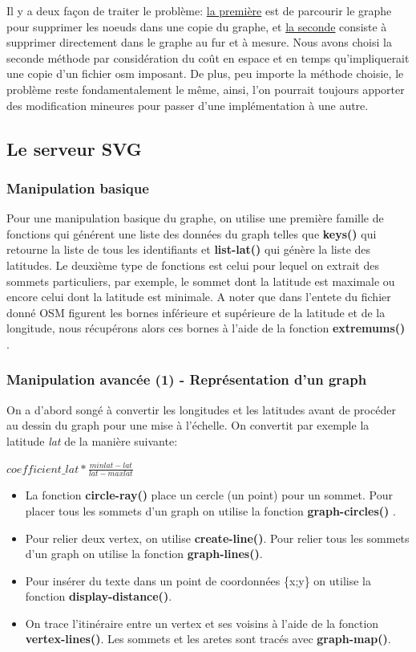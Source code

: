 \documentclass[french]{article}
\begin{document}
Il y a deux façon de traiter le problème: \underline{la première} est de parcourir le graphe pour supprimer les noeuds dans une copie du graphe, et \underline{la seconde} consiste à supprimer directement dans le graphe au fur et à mesure. Nous avons choisi la seconde méthode par considération du coût en espace et en temps qu'impliquerait une copie d'un fichier osm imposant. De plus, peu importe la méthode choisie, le problème reste fondamentalement le même, ainsi, l'on pourrait toujours apporter des modification mineures pour passer d'une implémentation à une autre.
\label{osmgraph}
\subsection{Le serveur SVG}
\subsubsection{Manipulation basique}
Pour une manipulation basique du graphe, on utilise une première famille de fonctions qui générent une liste des données du graph telles que \textbf{keys()} qui retourne la liste de tous les identifiants et \textbf{list-lat()} qui génère la liste des latitudes. 
\newline
Le deuxième type de fonctions est celui pour lequel on extrait des sommets particuliers, par exemple, le sommet dont la latitude est maximale ou encore celui dont la latitude est minimale. A noter que dans l'entete du fichier donné OSM figurent les bornes inférieure et supérieure de la latitude et de la longitude, nous récupérons alors ces bornes à l'aide de la fonction \textbf{extremums()} .
\subsubsection{Manipulation avancée (1) - Représentation d'un graph}
On a d'abord songé à convertir les longitudes et les latitudes avant de procéder au dessin du graph pour une mise à l'échelle. On convertit par exemple la latitude \textit{lat} de la manière suivante: 
\newline
\begin{center}
    $coefficient\_lat * \frac{minlat-lat}{lat - maxlat}$
\end{center}

\begin{itemize}
    \item La fonction \textbf{circle-ray()} place un cercle (un point) pour un sommet. Pour placer tous les sommets d'un graph on utilise la fonction \textbf{graph-circles()} .  
    \item Pour relier deux vertex, on utilise \textbf{create-line()}. Pour relier tous les sommets d'un graph on utilise la fonction \textbf{graph-lines()}. 
    \item Pour insérer  du texte dans un point de coordonnées \{x;y\} on utilise la fonction \textbf{display-distance()}. 
    \item On trace l'itinéraire entre un vertex et ses voisins à l'aide de la fonction \textbf{vertex-lines()}. Les sommets et les aretes sont tracés avec \textbf{graph-map()}.
\end{itemize}
\end{document}
